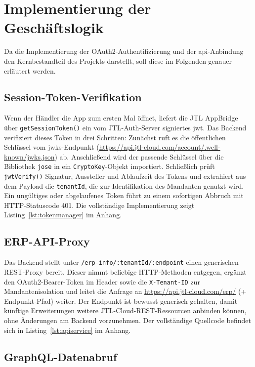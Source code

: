 \documentclass[11pt, a4paper, oneside]{report}
\begin{document}
\section{Implementierung der Geschäftslogik}

Da die Implementierung der OAuth2-Authentifizierung und der \gls{api}-Anbindung den
Kernbestandteil des Projekts darstellt, soll diese im Folgenden genauer erläutert werden.

\subsection{Session-Token-Verifikation}

Wenn der Händler die App zum ersten Mal öffnet, liefert die JTL AppBridge über
\texttt{getSessionToken()} ein vom JTL-Auth-Server signiertes \gls{jwt}.
Das Backend verifiziert dieses Token in drei Schritten: Zunächst ruft es
die öffentlichen Schlüssel vom \gls{jwks}-Endpunkt
(\url{https://api.jtl-cloud.com/account/.well-known/jwks.json}) ab.
Anschließend wird der passende Schlüssel über die Bibliothek \texttt{jose}
in ein \texttt{CryptoKey}-Objekt importiert. Schließlich prüft \texttt{jwtVerify()}
Signatur, Aussteller und Ablaufzeit des Tokens und extrahiert aus dem Payload
die \texttt{tenantId}, die zur Identifikation des Mandanten genutzt wird.
Ein ungültiges oder abgelaufenes Token führt zu einem sofortigen Abbruch mit
HTTP-Statuscode 401. Die vollständige Implementierung zeigt
Listing~\ref{lst:tokenmanager} im Anhang.

\subsection{ERP-API-Proxy}

Das Backend stellt unter \texttt{/erp-info/:tenantId/:endpoint} einen generischen
REST-Proxy bereit. Dieser nimmt beliebige HTTP-Methoden entgegen, ergänzt den
OAuth2-Bearer-Token im Header sowie die \texttt{X-Tenant-ID} zur Mandantenisolation
und leitet die Anfrage an \url{https://api.jtl-cloud.com/erp/} (+ Endpunkt-Pfad) weiter.
Der Endpunkt ist bewusst generisch gehalten, damit künftige Erweiterungen weitere
JTL-Cloud-REST-Ressourcen anbinden können, ohne Änderungen am Backend vorzunehmen.
Der vollständige Quellcode befindet sich in Listing~\ref{lst:apiservice} im Anhang.

\subsection{GraphQL-Datenabruf}
\label{sec:graphql}
\end{document}
